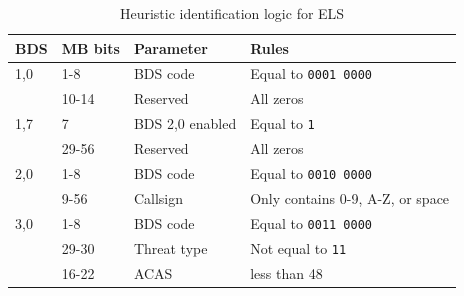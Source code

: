 \begin{table}
\centering
\small
\caption{Heuristic identification logic for ELS}
\label{tb:bds_rule_els}
\begin{tabular}{|l|l|l|l|}
\hline
\textbf{BDS} & \textbf{MB bits} & \textbf{Parameter} & \textbf{Rules} \\ \hline \hline
1,0 & 1-8 & BDS code & Equal to \texttt{0001 0000}  \\ \cline{2-4} 
 & 10-14 & Reserved & All zeros \\ \hline \hline
1,7 & 7 & BDS 2,0 enabled & Equal to \texttt{1} \\ \cline{2-4} 
 & 29-56 & Reserved & All zeros \\ \hline \hline
2,0 & 1-8 & BDS code & Equal to \texttt{0010 0000} \\ \cline{2-4} 
 & 9-56 & Callsign & Only contains 0-9, A-Z, or space \\ \hline \hline
3,0 & 1-8 & BDS code & Equal to \texttt{0011 0000} \\ \cline{2-4} 
 & 29-30 & Threat type & Not equal to \texttt{11} \\ \cline{2-4} 
 & 16-22 & ACAS &  less than 48 \\ \hline

\end{tabular}
\end{table}



